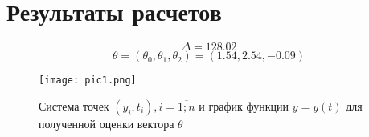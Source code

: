 \chapter{Результаты расчетов}

$$\Delta = 128.02$$
$$\theta = (\theta_0, \theta_1, \theta_2) = (1.54, 2.54, -0.09)$$

\begin{figure}[h]
  \centering
  \texttt{[image: pic1.png]}
  \caption{Система точек $(y_i, t_i), i = \overline{1;n}$ и график функции $y = y(t)$ для полученной оценки вектора $\theta$}
\end{figure}

